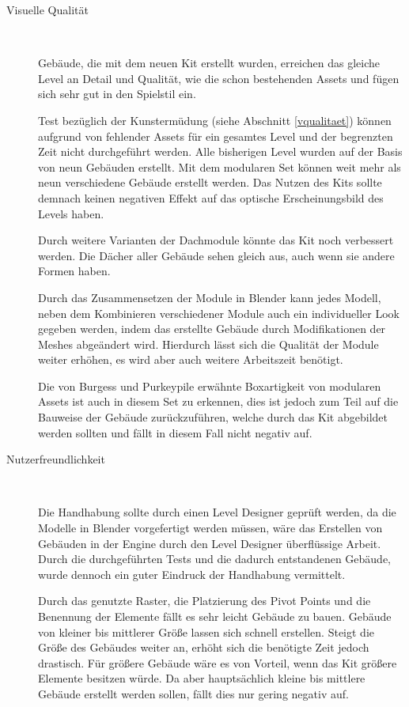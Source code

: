 \begin{description}
\item[Visuelle Qualität]~\par
Gebäude, die mit dem neuen Kit erstellt wurden, erreichen das gleiche Level an Detail und Qualität, wie die schon bestehenden Assets und fügen sich sehr gut in den Spielstil ein.
\par
Test bezüglich der Kunstermüdung (siehe Abschnitt \ref{vqualitaet}) können aufgrund von fehlender Assets für ein gesamtes Level und der begrenzten Zeit nicht durchgeführt werden. Alle bisherigen Level wurden auf der Basis von neun Gebäuden erstellt. Mit dem modularen Set können weit mehr als neun verschiedene Gebäude erstellt werden. Das Nutzen des Kits sollte demnach keinen negativen Effekt auf das optische Erscheinungsbild des Levels haben.
\par
Durch weitere Varianten der Dachmodule könnte das Kit noch verbessert werden. Die Dächer aller Gebäude sehen gleich aus, auch wenn sie andere Formen haben.
\par
Durch das Zusammensetzen der Module in Blender kann jedes Modell, neben dem Kombinieren verschiedener Module auch ein individueller Look gegeben werden, indem das erstellte Gebäude durch Modifikationen der Meshes abgeändert wird. Hierdurch lässt sich die Qualität der Module weiter erhöhen, es wird aber auch weitere Arbeitszeit benötigt.	
\par
Die von Burgess und Purkeypile erwähnte Boxartigkeit von modularen Assets ist auch in diesem Set zu erkennen, dies ist jedoch zum Teil auf die Bauweise der Gebäude zurückzuführen, welche durch das Kit abgebildet werden sollten und fällt in diesem Fall nicht negativ auf.
\item[Nutzerfreundlichkeit]~\par
Die Handhabung sollte durch einen Level Designer geprüft werden, da die Modelle in Blender vorgefertigt werden müssen, wäre das Erstellen von Gebäuden in der Engine durch den Level Designer überflüssige Arbeit. Durch die durchgeführten Tests und die dadurch entstandenen Gebäude, wurde dennoch ein guter Eindruck der Handhabung vermittelt.
\par
Durch das genutzte Raster, die Platzierung des Pivot Points und die Benennung der Elemente fällt es sehr leicht Gebäude zu bauen. Gebäude von kleiner bis mittlerer Größe lassen sich schnell erstellen. Steigt die Größe des Gebäudes weiter an, erhöht sich die benötigte Zeit jedoch drastisch. Für größere Gebäude wäre es von Vorteil, wenn das Kit größere Elemente besitzen würde. Da aber hauptsächlich kleine bis mittlere Gebäude erstellt werden sollen, fällt dies nur gering negativ auf.

\end{description}
